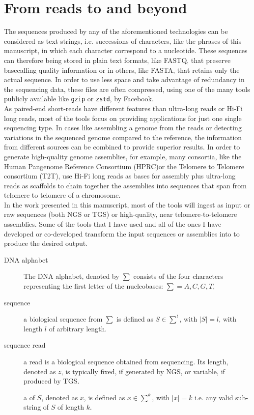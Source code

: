 \section{From reads to \kmers and beyond}
\label{sec:kmer}
The sequences produced by any of the aforementioned technologies can be considered as text strings, i.e. successions of characters, like the phrases of this manuscript, in which each character correspond to a nucleotide. These sequences can therefore being stored in plain text formats, like FASTQ, that preserve basecalling quality information or in others, like FASTA, that retains only the actual sequence. In order to use less space and take advantage of redundancy in the sequencing data, these files are often compressed, using one of the many tools publicly available like \texttt{gzip} or \texttt{zstd}, by Facebook.\\
As paired-end short-reads have different features than ultra-long reads or Hi-Fi long reads, most of the tools focus on providing applications for just one single sequencing type. In cases like assembling a genome from the reads or detecting variations in the sequenced genome compared to the reference, the information from different sources can be combined to provide superior results. In order to generate high-quality genome assemblies, for example, many consortia, like the Human Pangenome Reference Consortium (\gls{HPRC})or the Telomere to Telomere consortium (\gls{T2T}), use Hi-Fi long reads as bases for assembly plus ultra-long reads as scaffolds to chain together the assemblies into sequences that span from telomere to telomere of a chromosome.\\
In the work presented in this manuscript, most of the tools will ingest as input or raw sequences (both NGS or TGS) or high-quality, near telomere-to-telomere assemblies. Some of the tools that I have used and all of the ones I have developed or co-developed transform the input sequences or assemblies into \kmers to produce the desired output. \\
\begin{description}
	\item[DNA alphabet] The DNA alphabet, denoted by $\sum$ consists of the four characters representing the first letter of the nucleobases: $ \sum = {A, C, G, T}$, 
	\item[sequence] a biological sequence from $\sum$ is defined as $ S \in \sum^{l}$, with $\lvert S \rvert = l $, with length $l$ of arbitrary length.
	\item[sequence read] a read is a biological sequence obtained from sequencing. Its length, denoted as $z$, is typically fixed, if generated by NGS, or variable, if produced by TGS.
	\item[\kmer] a \kmer of $S$, denoted as $x$, is defined as $ x \in \sum^{k}$, with $\lvert x \rvert = k $ i.e. any valid sub-string of $S$ of length $k$. 
\end{description}
